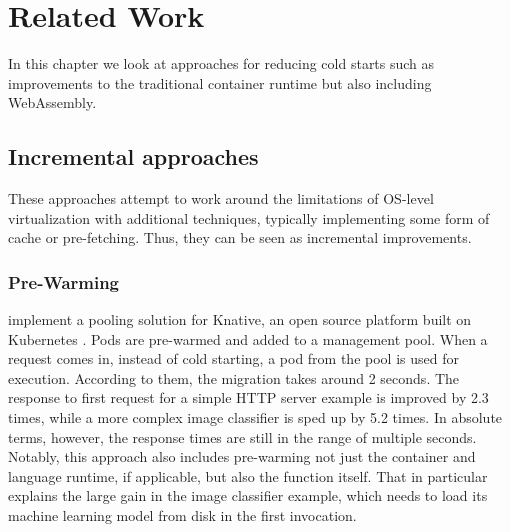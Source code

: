 \chapter{Related Work}
\label{chapter:relatedwork}

In this chapter we look at approaches for reducing cold starts such as improvements to the traditional container runtime but also including WebAssembly.

\section{Incremental approaches}

These approaches attempt to work around the limitations of OS-level virtualization with additional techniques, typically implementing some form of cache or pre-fetching. Thus, they can be seen as incremental improvements.

\subsection{Pre-Warming}

\citeauthor{Lin2019} implement a pooling solution for Knative, an open source platform built on Kubernetes \cite{Lin2019}. Pods are pre-warmed and added to a management pool. When a request comes in, instead of cold starting, a pod from the pool is used for execution. According to them, the migration takes around 2 seconds. The response to first request for a simple HTTP server example is improved by 2.3 times, while a more complex image classifier is sped up by 5.2 times. In absolute terms, however, the response times are still in the range of multiple seconds. Notably, this approach also includes pre-warming not just the container and language runtime, if applicable, but also the function itself. That in particular explains the large gain in the image classifier example, which needs to load its machine learning model from disk in the first invocation.

